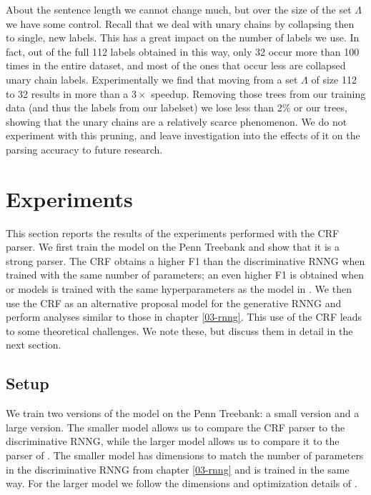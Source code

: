     About the sentence length we cannot change much, but over the size of the set $\Lambda$ we have some control. Recall that we deal with unary chains by collapsing then to single, new labels. This has a great impact on the number of labels we use. In fact, out of the full 112 labels obtained in this way, only 32 occur more than 100 times in the entire dataset, and most of the ones that occur less are collapsed unary chain labels. Experimentally we find that moving from a set $\Lambda$ of size 112 to 32 results in more than a $3\times$ speedup. Removing those trees from our training data (and thus the labels from our labelset) we lose less than 2\% or our trees, showing that the unary chains are a relatively scarce phenomenon. We do not experiment with this pruning, and leave investigation into the effects  of it on the parsing accuracy to future research.


\section{Experiments}
  This section reports the results of the experiments performed with the CRF parser. We first train the model on the Penn Treebank and show that it is a strong parser. The CRF obtains a higher F1 than the discriminative RNNG when trained with the same number of parameters; an even higher F1 is obtained when or models is trained with the same hyperparameters as the model in \citet{stern2017minimal}. We then use the CRF as an alternative proposal model for the generative RNNG and perform analyses similar to those in chapter \ref{03-rnng}. This use of the CRF leads to some theoretical challenges. We note these, but discuss them in detail in the next section.

  \subsection{Setup}
    We train two versions of the model on the Penn Treebank: a small version and a large version. The smaller model allows us to compare the CRF parser to the discriminative RNNG, while the larger model allows us to compare it to the parser of \citet{stern2017minimal}. The smaller model has dimensions to match the number of parameters in the discriminative RNNG from chapter \ref{03-rnng} and is trained in the same way. For the larger model we follow the dimensions and optimization details of \citet{stern2017minimal}.


